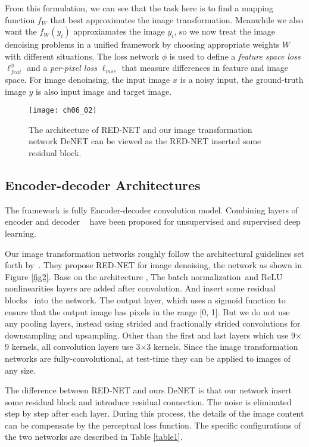 From this formulation, we can see that the task here is to find a mapping function $f_W$ that best approximates the image transformation. Meanwhile we also want the $f_W(y_i)$ approxiamates the image $y_i$, so we now treat the image denoising problems in a unified framework by choosing appropriate weights $W$ with different situations. The loss network $\phi$ is used to define a \emph{feature space loss} $\ell_{feat}^\phi$ and a \emph{per-pixel loss} $\ell_{mse}$ that measure differences in feature and image space. For image denoinsing, the input image $x$ is a noisy input, the ground-truth image $y$ is also input image and target image. 
\begin{figure}[t]
\centering
\texttt{[image: ch06\_02]}
\caption{ The architecture of RED-NET and our image transformation network DeNET can be viewed as the RED-NET inserted some residual block. }
\label{fig:ch06_02}
\vspace{-6mm}
\end{figure} 
\subsection{Encoder-decoder Architectures}
 The framework is fully Encoder-decoder convolution model. Combining layers of encoder and decoder ~\cite{DBLP:conf/iccv/NohHH15,hong2015decoupled,DBLP:conf/cvpr/LongSD15,DBLP:journals/pami/DongLHT16,Mao2016} have been proposed for unsupervised and supervised deep learning. 

Our image transformation networks roughly follow the architectural guidelines set forth by~\cite{Mao2016}. They propose RED-NET for image denoising, the network as shown in Figure \ref{fig2}. Base on the architecture , The batch normalization~\cite{Ioffe2015Batch}and ReLU nonlinearities layers are added after convolution. And insert some residual blocks~\cite{HeZRS15} into the network.  The output layer, which  uses a sigmoid function to ensure that the output image has pixels in the range [0, 1]. But we do not use any pooling layers, instead using strided and fractionally strided convolutions for downsampling and upsampling. Other than the first and last layers which use 9$\times$9 kernels, all convolution layers use 3$\times$3 kernels. Since the image transformation networks are fully-convolutional, at test-time they can be applied to images of any size.

The difference between RED-NET and ours DeNET is that our network  insert some residual block and introduce residual connection. The noise is eliminated step by step after each layer. During this process, the details of the image content can be compensate by the perceptual loss function.  The specific configurations of the two networks are described in Table \ref{table1}.

